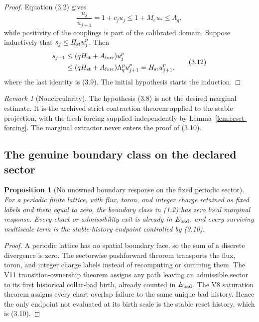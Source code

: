 \documentclass[11pt]{article}
\newtheorem{proposition}[theorem]{Proposition}
\theoremstyle{definition}
\theoremstyle{remark}
\newtheorem{remark}[theorem]{Remark}
\begin{document}
\begin{proof}
Equation (3.2) gives
\[
 \frac{u_j}{u_{j+1}}=1+c_ju_j\le1+M_cu_*\le\Lambda_q,     \tag{3.11}
\]
while positivity of the couplings is part of the calibrated domain.
Suppose inductively that $s_j\le H_{\rm st}u_j^p$.  Then
\[
\begin{split}
 s_{j+1}
 &\le(qH_{\rm st}+A_{\rm forc})u_j^p\\
 &\le(qH_{\rm st}+A_{\rm forc})\Lambda_q^pu_{j+1}^p
 =H_{\rm st}u_{j+1}^p,
\end{split}                                                  \tag{3.12}
\]
where the last identity is (3.9).  The initial hypothesis starts the
induction.
\end{proof}

\begin{remark}[Noncircularity]
The hypothesis (3.8) is not the desired marginal estimate.  It is the archived
strict contraction theorem applied to the stable projection, with the fresh
forcing supplied independently by Lemma~\ref{lem:reset-forcing}.  The
marginal extractor never enters the proof of (3.10).
\end{remark}

\subsection{The genuine boundary class on the declared sector}

\begin{proposition}[No unowned boundary response on the fixed periodic sector]
\label{prop:boundary-zero}
For a periodic finite lattice, with flux, toron, and integer charge retained
as fixed labels and theta equal to zero, the boundary class in (1.2) has zero
local marginal response.  Every chart or admissibility exit is already in
$E_{\rm bad}$, and every surviving multiscale term is the stable-history
endpoint controlled by (3.10).
\end{proposition}

\begin{proof}
A periodic lattice has no spatial boundary face, so the sum of a discrete
divergence is zero.  The sectorwise pushforward theorem transports the flux,
toron, and integer charge labels instead of recomputing or summing them.
The V11 transition-ownership theorem assigns any path leaving an admissible
sector to its first historical collar-bad birth, already counted in
$E_{\rm bad}$.  The V8 saturation theorem assigns every chart-overlap failure
to the same unique bad history.  Hence the only endpoint not evaluated at its
birth scale is the stable reset history, which is (3.10).
\end{proof}
\end{document}
